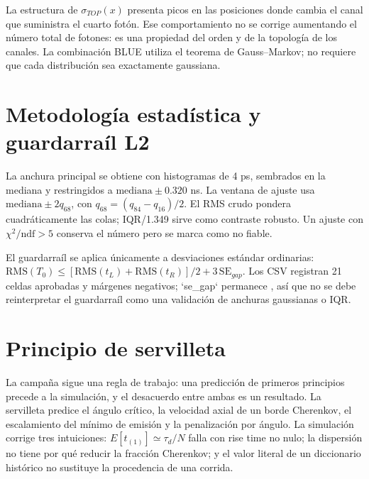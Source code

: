
La estructura de $\sigma_{TOP}(x)$ presenta picos en las posiciones donde cambia el canal que suministra el cuarto fotón. Ese comportamiento no se corrige aumentando el número total de fotones: es una propiedad del orden y de la topología de los canales. La combinación BLUE utiliza el teorema de Gauss--Markov; no requiere que cada distribución sea exactamente gaussiana.

\chapter{Metodología estadística y guardarraíl L2}
La anchura principal se obtiene con histogramas de 4 ps, sembrados en la mediana y restringidos a $\mathrm{mediana}\pm0.320$ ns. La ventana de ajuste usa $\mathrm{mediana}\pm2q_{68}$, con $q_{68}=(q_{84}-q_{16})/2$. El RMS crudo pondera cuadráticamente las colas; IQR/1.349 sirve como contraste robusto. Un ajuste con $\chi^2/\mathrm{ndf}>5$ conserva el número pero se marca como no fiable.


El guardarraíl se aplica únicamente a desviaciones estándar ordinarias: $\mathrm{RMS}(T_0)\le[\mathrm{RMS}(t_L)+\mathrm{RMS}(t_R)]/2+3\,\mathrm{SE}_{gap}$. Los CSV registran 21 celdas aprobadas y márgenes negativos; `se\_gap` permanece \NOTAVAILABLE, así que no se debe reinterpretar el guardarraíl como una validación de anchuras gaussianas o IQR.

\chapter{Principio de servilleta}
La campaña sigue una regla de trabajo: una predicción de primeros principios precede a la simulación, y el desacuerdo entre ambas es un resultado. La servilleta predice el ángulo crítico, la velocidad axial de un borde Cherenkov, el escalamiento del mínimo de emisión y la penalización por ángulo. La simulación corrige tres intuiciones: $E[t_{(1)}]\simeq\tau_d/N$ falla con rise time no nulo; la dispersión no tiene por qué reducir la fracción Cherenkov; y el valor literal de un diccionario histórico no sustituye la procedencia de una corrida.

